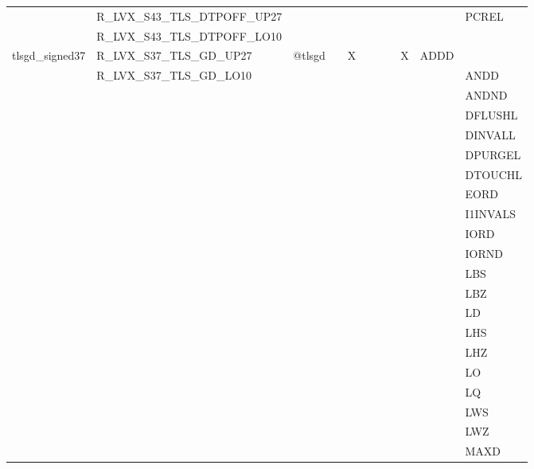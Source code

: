 {\begin{tabular}{|l|l|l|l|l|l|l|l|l|l|l|}
 & \textsf{R\_LVX\_S43\_TLS\_DTPOFF\_UP27} & & & & & & & & & \textsf{PCREL} \\
 & \textsf{R\_LVX\_S43\_TLS\_DTPOFF\_LO10} & & & & & & & & & \\
\hline
\textsf{tlsgd\_signed37} & \textsf{R\_LVX\_S37\_TLS\_GD\_UP27} & \textsf{@tlsgd} & \textsf{} & \textsf{X} & \textsf{} & \textsf{} & \textsf{} & \textsf{X} & \textsf{ADDD} \\
 & \textsf{R\_LVX\_S37\_TLS\_GD\_LO10} & & & & & & & & & \textsf{ANDD} \\
 & & & & & & & & & & \textsf{ANDND} \\
 & & & & & & & & & & \textsf{DFLUSHL} \\
 & & & & & & & & & & \textsf{DINVALL} \\
 & & & & & & & & & & \textsf{DPURGEL} \\
 & & & & & & & & & & \textsf{DTOUCHL} \\
 & & & & & & & & & & \textsf{EORD} \\
 & & & & & & & & & & \textsf{I1INVALS} \\
 & & & & & & & & & & \textsf{IORD} \\
 & & & & & & & & & & \textsf{IORND} \\
 & & & & & & & & & & \textsf{LBS} \\
 & & & & & & & & & & \textsf{LBZ} \\
 & & & & & & & & & & \textsf{LD} \\
 & & & & & & & & & & \textsf{LHS} \\
 & & & & & & & & & & \textsf{LHZ} \\
 & & & & & & & & & & \textsf{LO} \\
 & & & & & & & & & & \textsf{LQ} \\
 & & & & & & & & & & \textsf{LWS} \\
 & & & & & & & & & & \textsf{LWZ} \\
 & & & & & & & & & & \textsf{MAXD} \\
\hline\end{tabular}
}
\smallskip

